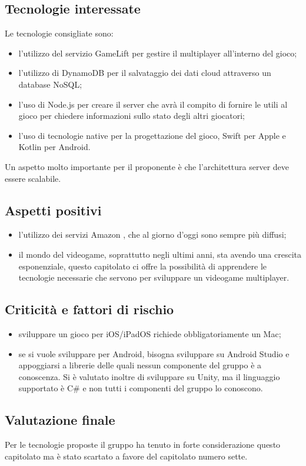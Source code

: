 \subsection{Tecnologie interessate}
Le tecnologie consigliate sono:
\begin{itemize}
\item l'utilizzo del servizio  GameLift per gestire il multiplayer all'interno del gioco;
\item l'utilizzo di  DynamoDB per il salvataggio dei dati cloud attraverso un database NoSQL;
\item l'uso di Node.js per creare il server che avrà il compito di fornire le  utili al gioco per chiedere informazioni sullo stato degli altri giocatori;
\item l'uso di tecnologie native per la progettazione del gioco, Swift per Apple e Kotlin per Android.
\end{itemize}
Un aspetto molto importante per il proponente è che l'architettura server deve essere scalabile.

\subsection{Aspetti positivi}
\begin{itemize}
\item l'utilizzo dei servizi Amazon , che al giorno d'oggi sono sempre più diffusi;
\item il mondo del videogame, soprattutto negli ultimi anni, sta avendo una crescita esponenziale, questo capitolato ci offre la possibilità di apprendere le tecnologie necessarie che servono per sviluppare un videogame multiplayer.
\end{itemize}

\subsection{Criticità e fattori di rischio}
\begin{itemize}
\item sviluppare un gioco per iOS/iPadOS richiede obbligatoriamente un Mac;
\item se si vuole sviluppare per Android, bisogna sviluppare su Android Studio e appoggiarsi a librerie delle quali nessun componente del gruppo è a conoscenza. Si è valutato inoltre di sviluppare su Unity, ma il linguaggio supportato è C\# e non tutti i componenti del gruppo lo conoscono.
\end{itemize}

\subsection{Valutazione finale}
Per le tecnologie proposte il gruppo \textit{\Gruppo{}} ha tenuto in forte considerazione questo capitolato ma è stato scartato a favore del capitolato numero sette.